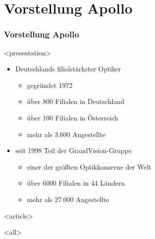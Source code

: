 
\section{Vorstellung Apollo}

\begin{frame}[fragile]
\frametitle<presentation>{Vorstellung Apollo}




\mode
<presentation>

\begin{itemize}
\item Deutschlands filialstärkster Optiker
\begin{itemize}
\item gegründet 1972
\item über 800 Filialen in Deutschland
\item über 100 Filialen in Österreich
\item mehr als 3.600 Angestellte
\end{itemize}
\item seit 1998 Teil der GrandVision-Gruppe
\begin{itemize}
\item einer der größten Optikkonzerne der Welt
\item über 6000 Filialen in 44 Ländern
\item mehr als 27.000 Angestellte
\end{itemize}
\end{itemize}


\mode
<article>


\mode
<all>

\end{frame}
\newpage
\clearpage
